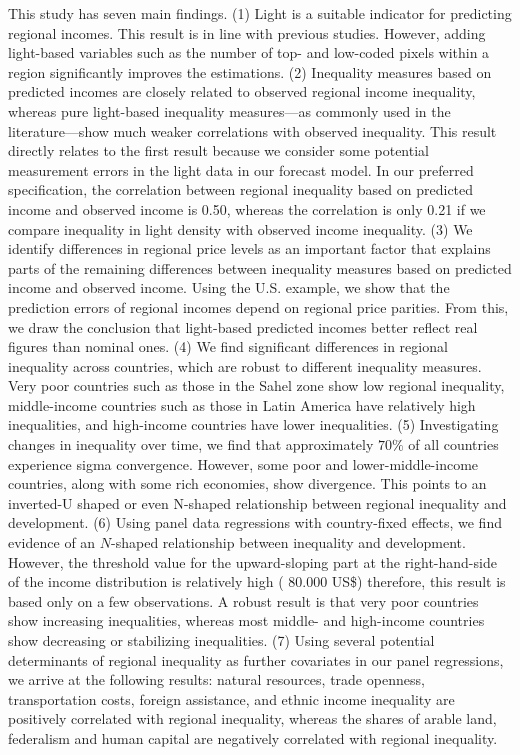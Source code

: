 \documentclass[10pt]{article}
\begin{document}
This study has seven main findings. 
(1) Light is a suitable indicator for predicting regional incomes. 
This result is in line with previous studies. 
However, adding light-based variables such as the number of top- and low-coded pixels within a region significantly improves the estimations. 
(2) Inequality measures based on predicted incomes are closely related to observed regional income inequality, whereas pure light-based inequality measures---as commonly used in the literature---show much weaker correlations with observed inequality. 
This result directly relates to the first result because we consider some potential measurement errors in the light data in our forecast model. 
In our preferred specification, the correlation between regional inequality based on predicted income and observed income is 0.50, whereas the correlation is only 0.21 if we compare inequality in light density with observed income inequality. 
(3) We identify differences in regional price levels as an important factor that explains parts of the remaining differences between inequality measures based on predicted income and observed income. 
Using the U.S. example, we show that the prediction errors of regional incomes depend on regional price parities. 
From this, we draw the conclusion that light-based predicted incomes better reflect real figures than nominal ones. 
(4) We find significant differences in regional inequality across countries, which are robust to different inequality measures. 
Very poor countries such as those in the Sahel zone show low regional inequality, middle-income countries such as those in Latin America have relatively high inequalities, and high-income countries have lower inequalities. 
(5) Investigating changes in inequality over time, we find that approximately $70 \%$ of all countries experience sigma convergence. 
However, some poor and lower-middle-income countries, along with some rich economies, show divergence. 
This points to an inverted-U shaped or even N-shaped relationship between regional inequality and development. 
(6) Using panel data regressions with country-fixed effects, we find evidence of an $N$-shaped relationship between inequality and development. 
However, the threshold value for the upward-sloping part at the right-hand-side of the income distribution is relatively high ( 80.000 US\$) therefore, this result is based only on a few observations.
A robust result is that very poor countries show increasing inequalities, whereas most middle- and high-income countries show decreasing or stabilizing inequalities.
(7) Using several potential determinants of regional inequality as further covariates in our panel regressions, we arrive at the following results: natural resources, trade openness, transportation costs, foreign assistance, and ethnic income inequality are positively correlated with regional inequality, whereas the shares of arable land, federalism and human capital are negatively correlated with regional inequality.
\end{document}
